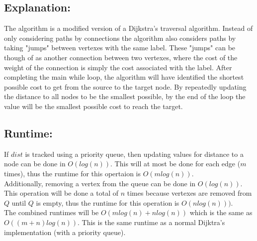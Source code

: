 \documentclass[11pt]{article}
\begin{document}
\subsection*{Explanation:}
The algorithm is a modified version of a Dijkstra's traversal algorithm. Instead of only considering paths by connections the algorithm also considers paths by taking "jumps" between vertexes with the same label. These "jumps" can be though of as another connection between two vertexes, where the cost of the weight of the connection is simply the cost associated with the label. After completing the main while loop, the algorithm will have identified the shortest possible cost to get from the source to the target node. By repeatedly updating the distance to all nodes to be the smallest possible, by the end of the loop the value will be the smallest possible cost to reach the target.

\subsection*{Runtime:}
\indent If $dist$ is tracked using a priority queue, then updating values for distance to a node can be done in $O(log(n))$. This will at most be done for each edge ($m$ times), thus the runtime for this opertaion is $O(mlog(n))$.\\
\indent  Additionally, removing a vertex from the queue can be done in $O(log(n))$. This operation will be done a total of $n$ times because vertexes are removed from $Q$ until $Q$ is empty, thus the runtime for this operation is $O(nlog(n)))$.\\
\indent  The combined runtimes will be $O(mlog(n) + nlog(n))$ which is the same as $O((m+n)log(n))$. This is the same runtime as a normal Dijktra's implementation (with a priority queue).
\end{document}
